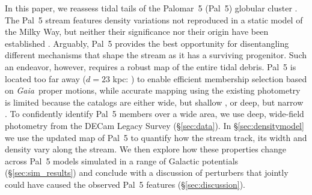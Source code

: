 \documentclass[twocolumn]{aastex62}
\newcommand{\gaia}{\textsl{Gaia}}
\begin{document}
In this paper, we reassess tidal tails of the Palomar~5 (Pal~5) globular cluster \citep{Odenkirchen:2001, Rockosi:2002}.
The Pal~5 stream features density variations not reproduced in a static model of the Milky Way, but neither their significance nor their origin have been established \citep{Carlberg:2012, Bernard:2016, Ibata:2016, Erkal:2017}.
Arguably, Pal~5 provides the best opportunity for disentangling different mechanisms that shape the stream as it has a surviving progenitor. Such an endeavor, however, requires a robust map of the entire tidal debris.
Pal~5 is located too far away ($d = 23$ kpc: \citealt{Dotter:2011}) to enable efficient membership selection based on \gaia\ proper motions, while accurate mapping using the existing photometry is limited because the catalogs are either wide, but shallow \citep{Bernard:2016}, or deep, but narrow \citep{Ibata:2016}.
To confidently identify Pal~5 members over a wide area, we use deep, wide-field photometry from the DECam Legacy Survey (\S\ref{sec:data}).
In \S\ref{sec:densitymodel} we use the updated map of Pal~5 to quantify how the stream track, its width and density vary along the stream.
We then explore how these properties change across Pal~5 models simulated in a range of Galactic potentials (\S\ref{sec:sim_results}) and conclude with a discussion of perturbers that jointly could have caused the observed Pal~5 features (\S\ref{sec:discussion}).
\end{document}
